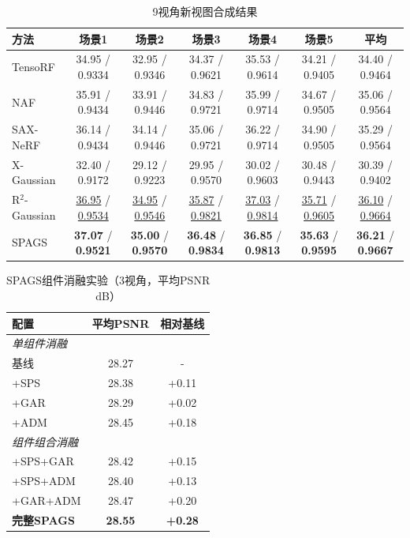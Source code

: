 \begin{table}[htbp]
    \centering
    \caption{9视角新视图合成结果}
    \label{tab:spags_9view}
    \footnotesize
    \begin{tabular*}{\textwidth}{@{\extracolsep{\fill}}lcccccc@{}}
        \toprule
        方法 & 场景1 & 场景2 & 场景3 & 场景4 & 场景5 & 平均 \\
        \midrule
        TensoRF & 34.95 / 0.9334 & 32.95 / 0.9346 & 34.37 / 0.9621 & 35.53 / 0.9614 & 34.21 / 0.9405 & 34.40 / 0.9464 \\
        NAF & 35.91 / 0.9434 & 33.91 / 0.9446 & 34.83 / 0.9721 & 35.99 / 0.9714 & 34.67 / 0.9505 & 35.06 / 0.9564 \\
        SAX-NeRF & 36.14 / 0.9434 & 34.14 / 0.9446 & 35.06 / 0.9721 & 36.22 / 0.9714 & 34.90 / 0.9505 & 35.29 / 0.9564 \\
        X-Gaussian & 32.40 / 0.9172 & 29.12 / 0.9223 & 29.95 / 0.9570 & 30.02 / 0.9603 & 30.48 / 0.9443 & 30.39 / 0.9402 \\
        R$^2$-Gaussian & \underline{36.95} / \underline{0.9534} & \underline{34.95} / \underline{0.9546} & \underline{35.87} / \underline{0.9821} & \underline{37.03} / \underline{0.9814} & \underline{35.71} / \underline{0.9605} & \underline{36.10} / \underline{0.9664} \\
        SPAGS & \textbf{37.07} / \textbf{0.9521} & \textbf{35.00} / \textbf{0.9570} & \textbf{36.48} / \textbf{0.9834} & \textbf{36.85} / \textbf{0.9813} & \textbf{35.63} / \textbf{0.9595} & \textbf{36.21} / \textbf{0.9667} \\
        \bottomrule
    \end{tabular*}
\end{table}

\begin{table}[htbp]
    \centering
    \caption{SPAGS组件消融实验（3视角，平均PSNR dB）}
    \label{tab:spags_ablation}
    \begin{tabular}{lcc}
        \toprule
        配置 & 平均PSNR & 相对基线 \\
        \midrule
        \multicolumn{3}{l}{\textit{单组件消融}} \\
        基线 & 28.27 & - \\
        +SPS & 28.38 & +0.11 \\
        +GAR & 28.29 & +0.02 \\
        +ADM & 28.45 & +0.18 \\
        \midrule
        \multicolumn{3}{l}{\textit{组件组合消融}} \\
        +SPS+GAR & 28.42 & +0.15 \\
        +SPS+ADM & 28.40 & +0.13 \\
        +GAR+ADM & 28.47 & +0.20 \\
        \textbf{完整SPAGS} & \textbf{28.55} & \textbf{+0.28} \\
        \bottomrule
    \end{tabular}
\end{table}

